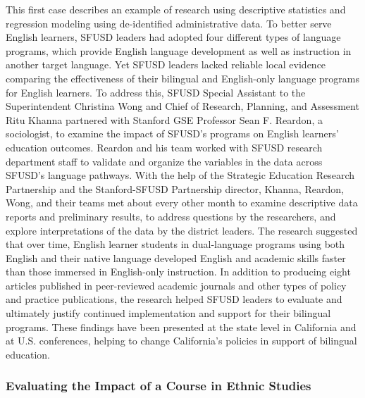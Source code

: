 This first case describes an example of research using descriptive statistics and regression modeling using de-identified administrative data. To better serve English learners, SFUSD leaders had adopted four different types of language programs, which provide English language development as well as instruction in another target language. Yet SFUSD leaders lacked reliable local evidence comparing the effectiveness of their bilingual and English-only language programs for English learners. To address this, SFUSD Special Assistant to the Superintendent Christina Wong and Chief of Research, Planning, and Assessment Ritu Khanna partnered with Stanford GSE Professor Sean F. Reardon, a sociologist, to examine the impact of SFUSD's programs on English learners' education outcomes. Reardon and his team worked with SFUSD research department staff to validate and organize the variables in the data across SFUSD's language pathways. With the help of the Strategic Education Research Partnership and the Stanford-SFUSD Partnership director, Khanna, Reardon, Wong, and their teams met about every other month to examine descriptive data reports and preliminary results, to address questions by the researchers, and explore interpretations of the data by the district leaders. The research suggested that over time, English learner students in dual-language programs using both English and their native language developed English and academic skills faster than those immersed in English-only instruction. In addition to producing eight articles published in peer-reviewed academic journals and other types of policy and practice publications, the research helped SFUSD leaders to evaluate and ultimately justify continued implementation and support for their bilingual programs. These findings have been presented at the state level in California and at U.S. conferences, helping to change California's policies in support of bilingual education.

\hypertarget{evaluating-the-impact-of-a-course-in-ethnic-studies}{%
\subsubsection*{Evaluating the Impact of a Course in Ethnic Studies}\label{evaluating-the-impact-of-a-course-in-ethnic-studies}}

